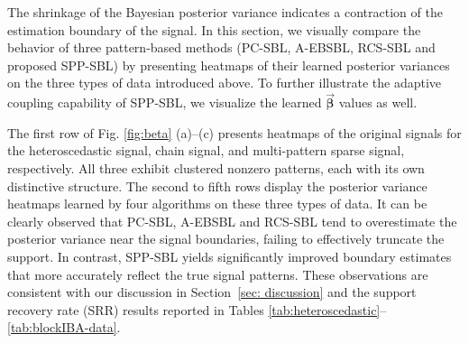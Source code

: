 \documentclass[lettersize,journal]{IEEEtran}
\theoremstyle{remark}
\begin{document}
The shrinkage of the Bayesian posterior variance indicates a contraction of the estimation boundary of the signal. In this section, we visually compare the behavior of three pattern-based methods (PC-SBL, A-EBSBL, RCS-SBL and proposed SPP-SBL) by presenting heatmaps of their learned posterior variances on the three types of data introduced above. To further illustrate the adaptive coupling capability of SPP-SBL, we visualize the learned $\vec{\boldsymbol{\beta}}$ values as well.


The first row of Fig. \ref{fig:beta} (a)–(c) presents heatmaps of the original signals for the heteroscedastic signal, chain signal, and multi-pattern sparse signal, respectively. All three exhibit clustered nonzero patterns, each with its own distinctive structure. The second to fifth rows display the posterior variance heatmaps learned by four algorithms on these three types of data. It can be clearly observed that PC-SBL, A-EBSBL and RCS-SBL tend to overestimate the posterior variance near the signal boundaries, failing to effectively truncate the support. In contrast, SPP-SBL yields significantly improved boundary estimates that more accurately reflect the true signal patterns. These observations are consistent with our discussion in Section~\ref{sec: discussion} and the support recovery rate (SRR) results reported in Tables \ref{tab:heteroscedastic}–\ref{tab:blockIBA-data}.
\end{document}
